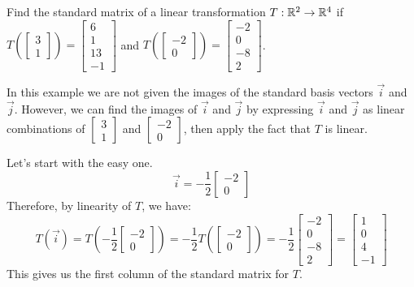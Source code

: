 \documentclass{ximera}
\begin{document}
 \begin{example}
 Find the standard matrix of a linear transformation $T:\mathbb{R}^2\rightarrow \mathbb{R}^4$ if $T\left(\begin{bmatrix}3\\1\end{bmatrix}\right)=\begin{bmatrix}6\\1\\13\\-1\end{bmatrix}$ and $T\left(\begin{bmatrix}-2\\0\end{bmatrix}\right)=\begin{bmatrix}-2\\0\\-8\\2\end{bmatrix}$.  
\begin{explanation}
In this example we are not given the images of the standard basis vectors $\vec{i}$ and $\vec{j}$.  However, we can find the images of $\vec{i}$ and $\vec{j}$ by expressing $\vec{i}$ and $\vec{j}$ as linear combinations of $\begin{bmatrix}3\\1\end{bmatrix}$ and $\begin{bmatrix}-2\\0\end{bmatrix}$, then apply the fact that $T$ is linear.

Let's start with the easy one.  
$$\vec{i}=-\frac{1}{2}\begin{bmatrix}-2\\0\end{bmatrix}$$
Therefore, by linearity of $T$, we have:
$$T(\vec{i})=T\left(-\frac{1}{2}\begin{bmatrix}-2\\0\end{bmatrix}\right)=-\frac{1}{2}T\left(\begin{bmatrix}-2\\0\end{bmatrix}\right)=-\frac{1}{2}\begin{bmatrix}-2\\0\\-8\\2\end{bmatrix}=\begin{bmatrix}1\\0\\4\\-1\end{bmatrix}$$
This gives us the first column of the standard matrix for $T$.


\end{explanation}
\end{example}
\end{document}
